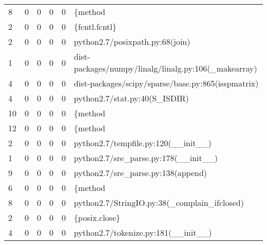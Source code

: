 \begin{tabular}{lrrrrl}
 8        &     0     &     0     &     0     &     0     & \{method                                                                  \\
 2        &     0     &     0     &     0     &     0     & \{fcntl.fcntl\}                                                            \\
 2        &     0     &     0     &     0     &     0     & python2.7/posixpath.py:68(join)                                          \\
 1        &     0     &     0     &     0     &     0     & dist-packages/numpy/linalg/linalg.py:106(\_makearray)                     \\
 4        &     0     &     0     &     0     &     0     & dist-packages/scipy/sparse/base.py:865(isspmatrix)                       \\
 4        &     0     &     0     &     0     &     0     & python2.7/stat.py:40(S\_ISDIR)                                            \\
 10       &     0     &     0     &     0     &     0     & \{method                                                                  \\
 12       &     0     &     0     &     0     &     0     & \{method                                                                  \\
 2        &     0     &     0     &     0     &     0     & python2.7/tempfile.py:120(\_\_init\_\_)                                      \\
 1        &     0     &     0     &     0     &     0     & python2.7/sre\_parse.py:178(\_\_init\_\_)                                     \\
 9        &     0     &     0     &     0     &     0     & python2.7/sre\_parse.py:138(append)                                       \\
 6        &     0     &     0     &     0     &     0     & \{method                                                                  \\
 8        &     0     &     0     &     0     &     0     & python2.7/StringIO.py:38(\_complain\_ifclosed)                             \\
 2        &     0     &     0     &     0     &     0     & \{posix.close\}                                                            \\
 4        &     0     &     0     &     0     &     0     & python2.7/tokenize.py:181(\_\_init\_\_)                                      \\

\end{tabular}
